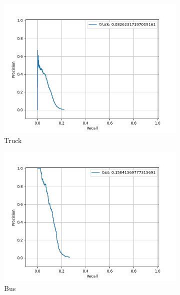 \begin{figure}
    	\begin{subfigure}[t]{0.325\textwidth}
    		\centering
    		\includegraphics[width=\textwidth]{images/basic_pr/class_truck_pr.jpg}
    		\caption{Truck}
    	\end{subfigure}
    	\begin{subfigure}[t]{0.325\textwidth}
    		\centering
    		\includegraphics[width=\textwidth]{images/basic_pr/class_bus_pr.jpg}
    		\caption{Bus}
    	\end{subfigure}
    	\begin{subfigure}[t]{0.325\textwidth}
    		\centering

\end{subfigure}
\end{figure}
